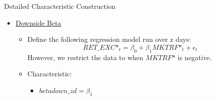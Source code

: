 \documentclass[12pt,title,fleqn]{article}
\begin{document}
\begin{section}{Detailed Characteristic Construction}
\begin{itemize}
\begin{itemize}
                \item Characteristics \footnote{$z$ indicates over how many days the model is run.}:
                    \begin{align*}
                        beta\_zd &= \beta_1 \text{ from the CAPM model} \\
                        ivol\_capm\_zd_t &= \sigma_{zD}(\epsilon_t) \\
                        ivol\_ff3\_zd_t &= \sigma_{zD}(e_t) \\
                        ivol\_hxz4\_zd_t &= \sigma_{zD}(\mu_t) \\
                        iskew\_capm\_zd_t &= SKEW\_zD(\epsilon_t) \\
                        iskew\_ff3\_zd_t &= SKEW\_zD(e_t) \\
                        iskew\_hxz4\_zd_t &= SKEW\_zD(\sigma_t) \\
                    \end{align*}
            \end{itemize}
            
        \item \hyperlink{dbeta2}{\hypertarget{dbeta}{Downside Beta}}
            \begin{itemize}
                \item Define the following regression model run over z days:
                    \begin{equation*}
                        RET\_EXC\mbox{*}_t = \beta_0 + \beta_1 MKTRF\mbox{*}_t + \epsilon_t
                    \end{equation*}
                    However, we restrict the data to when $MKTRF\mbox{*}$ is negative.
                \item Characteristic:
                    \begin{itemize}
                        \item $betadown\_zd = \beta_1$
                    \end{itemize}
            \end{itemize}
            
    \end{itemize}

\end{section}
\end{document}
